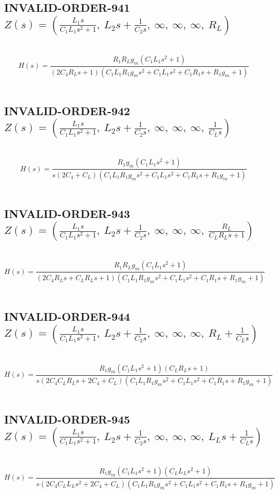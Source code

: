 \documentclass{article}
\begin{document}
\subsection{INVALID-ORDER-941 $Z(s) = \left( \frac{L_{1} s}{C_{1} L_{1} s^{2} + 1}, \  L_{2} s + \frac{1}{C_{2} s}, \  \infty, \  \infty, \  \infty, \  R_{L}\right)$ } \ 
\textbf{\[H(s) = \frac{R_{1} R_{L} g_{m} \left(C_{1} L_{1} s^{2} + 1\right)}{\left(2 C_{4} R_{L} s + 1\right) \left(C_{1} L_{1} R_{1} g_{m} s^{2} + C_{1} L_{1} s^{2} + C_{1} R_{1} s + R_{1} g_{m} + 1\right)}\] } \ 
\subsection{INVALID-ORDER-942 $Z(s) = \left( \frac{L_{1} s}{C_{1} L_{1} s^{2} + 1}, \  L_{2} s + \frac{1}{C_{2} s}, \  \infty, \  \infty, \  \infty, \  \frac{1}{C_{L} s}\right)$ } \ 
\textbf{\[H(s) = \frac{R_{1} g_{m} \left(C_{1} L_{1} s^{2} + 1\right)}{s \left(2 C_{4} + C_{L}\right) \left(C_{1} L_{1} R_{1} g_{m} s^{2} + C_{1} L_{1} s^{2} + C_{1} R_{1} s + R_{1} g_{m} + 1\right)}\] } \ 
\subsection{INVALID-ORDER-943 $Z(s) = \left( \frac{L_{1} s}{C_{1} L_{1} s^{2} + 1}, \  L_{2} s + \frac{1}{C_{2} s}, \  \infty, \  \infty, \  \infty, \  \frac{R_{L}}{C_{L} R_{L} s + 1}\right)$ } \ 
\textbf{\[H(s) = \frac{R_{1} R_{L} g_{m} \left(C_{1} L_{1} s^{2} + 1\right)}{\left(2 C_{4} R_{L} s + C_{L} R_{L} s + 1\right) \left(C_{1} L_{1} R_{1} g_{m} s^{2} + C_{1} L_{1} s^{2} + C_{1} R_{1} s + R_{1} g_{m} + 1\right)}\] } \ 
\subsection{INVALID-ORDER-944 $Z(s) = \left( \frac{L_{1} s}{C_{1} L_{1} s^{2} + 1}, \  L_{2} s + \frac{1}{C_{2} s}, \  \infty, \  \infty, \  \infty, \  R_{L} + \frac{1}{C_{L} s}\right)$ } \ 
\textbf{\[H(s) = \frac{R_{1} g_{m} \left(C_{1} L_{1} s^{2} + 1\right) \left(C_{L} R_{L} s + 1\right)}{s \left(2 C_{4} C_{L} R_{L} s + 2 C_{4} + C_{L}\right) \left(C_{1} L_{1} R_{1} g_{m} s^{2} + C_{1} L_{1} s^{2} + C_{1} R_{1} s + R_{1} g_{m} + 1\right)}\] } \ 
\subsection{INVALID-ORDER-945 $Z(s) = \left( \frac{L_{1} s}{C_{1} L_{1} s^{2} + 1}, \  L_{2} s + \frac{1}{C_{2} s}, \  \infty, \  \infty, \  \infty, \  L_{L} s + \frac{1}{C_{L} s}\right)$ } \ 
\textbf{\[H(s) = \frac{R_{1} g_{m} \left(C_{1} L_{1} s^{2} + 1\right) \left(C_{L} L_{L} s^{2} + 1\right)}{s \left(2 C_{4} C_{L} L_{L} s^{2} + 2 C_{4} + C_{L}\right) \left(C_{1} L_{1} R_{1} g_{m} s^{2} + C_{1} L_{1} s^{2} + C_{1} R_{1} s + R_{1} g_{m} + 1\right)}\] } \ 
\end{document}

